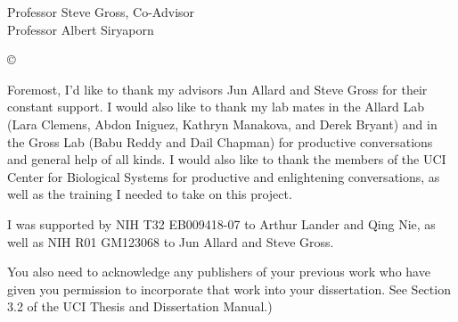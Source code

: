 



\othercommitteemembers
{
  Professor Steve Gross, Co-Advisor\\
  Professor Albert Siryaporn
}


\copyrightdeclaration
{
  {\copyright} {\Degreeyear} \Authorname
}


%  

\acknowledgments
{
Foremost, I'd like to thank my advisors Jun Allard and Steve Gross for their constant support. I would also like to thank my lab mates in the Allard Lab (Lara Clemens, Abdon Iniguez, Kathryn Manakova, and Derek Bryant) and in the Gross Lab (Babu Reddy and Dail Chapman) for productive conversations and general help of all kinds. I would also like to thank the members of the UCI Center for Biological Systems for productive and enlightening conversations, as well as the training I needed to take on this project.

I was supported by NIH T32 EB009418-07 to Arthur Lander and Qing Nie, as well as NIH R01 GM123068 to Jun Allard and Steve Gross.
  
  You also need to acknowledge any publishers of your previous
  work who have given you permission to incorporate that work
  into your dissertation. See Section 3.2 of the UCI Thesis and
  Dissertation Manual.)
}


